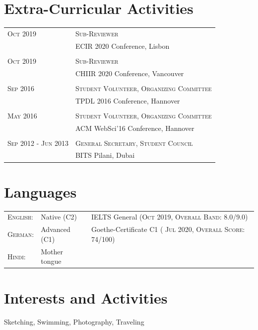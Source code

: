 \documentclass[a4paper,10pt]{article} %
\begin{document}

\section{Extra-Curricular Activities}

\begin{tabular}{ll}
\textsc{Oct 2019} & \textsc{Sub-Reviewer}\\
& ECIR 2020 Conference, Lisbon\\
\\
\textsc{Oct 2019} & \textsc{Sub-Reviewer}\\
& CHIIR 2020 Conference, Vancouver\\
\\
\textsc{Sep 2016} & \textsc{Student Volunteer, Organizing Committee}\\
& TPDL 2016 Conference, Hannover\\
\\
\textsc{May 2016} & \textsc{Student Volunteer, Organizing Committee}\\
& ACM WebSci'16 Conference, Hannover\\
\\
\textsc{Sep 2012 - Jun 2013} & \textsc{General Secretary, Student Council}\\
& BITS Pilani, Dubai\\
\end{tabular}


\section{Languages}

\begin{tabular}{lll}
\textsc{English:} & Native (C2) & IELTS General (\textsc{Oct 2019, Overall Band: 8.0/9.0})\\

\textsc{German:} & Advanced (C1) & Goethe-Certificate C1 ( \textsc{Jul 2020, Overall Score: 74/100})\\

\textsc{Hindi:} & Mother tongue &\\
\end{tabular}


\section{Interests and Activities}

Sketching, Swimming, Photography, Traveling
\end{document}
